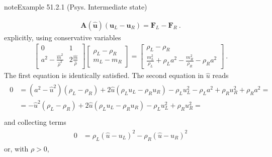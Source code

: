 \documentclass[letterpaper,10pt,english]{jupyterBook}
\begin{document}
\begin{sphinxadmonition}{note}{Example 51.2.1 (P\sphinxhyphen{}sys. Intermediate state)}
\begin{enumerate}
\end{enumerate}
\begin{equation*}
\begin{split}\mathbf{A}(\hat{\mathbf{u}})(\mathbf{u}_L - \mathbf{u}_R) = \mathbf{F}_L - \mathbf{F}_R \ .\end{split}
\end{equation*}
\sphinxAtStartPar
explicitly, using conservative variables
\begin{equation*}
\begin{split}
\begin{bmatrix} 0 & 1 \\ a^2 - \frac{\hat{m}^2}{\hat{\rho}^2} & 2 \frac{\hat{m}}{\hat{\rho}}  \end{bmatrix}
\begin{bmatrix} \rho_L - \rho_R \\ m_L - m_R \end{bmatrix} = 
\begin{bmatrix} \rho_L - \rho_R \\ \frac{m_L^2}{\rho_L} + \rho_L a^2 - \frac{m_R^2}{\rho_R} - \rho_R a^2 \end{bmatrix} \ .
\end{split}
\end{equation*}
\sphinxAtStartPar
The first equation is identically satisfied. The second equation in \(\hat{u}\) reads
\begin{equation*}
\begin{split}\begin{aligned}
  0
  & = (a^2 - \hat{u}^2) (\rho_L - \rho_R) + 2 \hat{u} \left( \rho_L u_L - \rho_R u_R \right) - \rho_L u_L^2 - \rho_L a^2 + \rho_R u_R^2 + \rho_R a^2 =  \\
  & = - \hat{u}^2 (\rho_L - \rho_R) + 2 \hat{u} \left( \rho_L u_L - \rho_R u_R \right) - \rho_L u_L^2 + \rho_R u_R^2 =  \\
\end{aligned}\end{split}
\end{equation*}
\sphinxAtStartPar
and collecting terms
\begin{equation*}
\begin{split}\begin{aligned}
  0
  & = \rho_L ( \hat{u} - u_L )^2 - \rho_R (\hat{u} - u_R )^2 
\end{aligned}\end{split}
\end{equation*}
\sphinxAtStartPar
or, with \(\rho > 0\),
\begin{equation*}

\end{equation*}
\end{sphinxadmonition}
\end{document}
